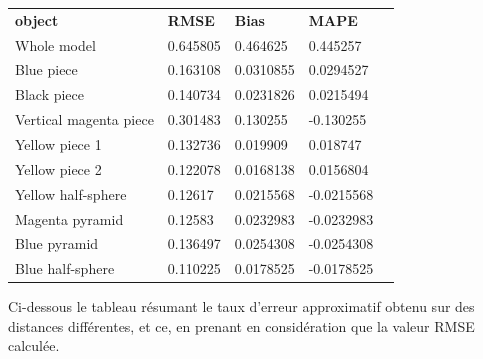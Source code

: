 \documentclass[a4paper, 12pt]{book}
\begin{document}
\begin{table}[H]
\begin{tabular}{c|llll}
\cline{1-4}
\multicolumn{1}{|l|}{\textbf{object}}   & \multicolumn{1}{l|}{\textbf{RMSE}} & \multicolumn{1}{l|}{\textbf{Bias}} & \multicolumn{1}{l|}{\textbf{MAPE}} &  \\
\cline{1-4}
\multicolumn{1}{|l|}{Whole model}  & \multicolumn{1}{l|}{0.645805}  & \multicolumn{1}{l|}{0.464625}  & \multicolumn{1}{l|}{0.445257}  &  \\ 
\cline{1-4}
\multicolumn{1}{|l|}{Blue piece}  & \multicolumn{1}{l|}{0.163108}  & \multicolumn{1}{l|}{0.0310855}  & \multicolumn{1}{l|}{0.0294527}  &  \\ 
\cline{1-4}
\multicolumn{1}{|l|}{Black piece}  & \multicolumn{1}{l|}{0.140734}  & \multicolumn{1}{l|}{0.0231826}  & \multicolumn{1}{l|}{0.0215494}  &  \\ 
\cline{1-4}
\multicolumn{1}{|l|}{Vertical magenta piece}  & \multicolumn{1}{l|}{0.301483}  & \multicolumn{1}{l|}{0.130255}  & \multicolumn{1}{l|}{-0.130255}  &  \\ 
\cline{1-4}
\multicolumn{1}{|l|}{Yellow piece 1}  & \multicolumn{1}{l|}{0.132736}  & \multicolumn{1}{l|}{0.019909}  & \multicolumn{1}{l|}{0.018747}  &  \\ 
\cline{1-4}
\multicolumn{1}{|l|}{Yellow piece 2}  & \multicolumn{1}{l|}{0.122078}  & \multicolumn{1}{l|}{0.0168138}  & \multicolumn{1}{l|}{0.0156804}  &  \\ 
\cline{1-4}
\multicolumn{1}{|l|}{Yellow half-sphere}  & \multicolumn{1}{l|}{0.12617}  & \multicolumn{1}{l|}{0.0215568}  & \multicolumn{1}{l|}{-0.0215568}  &  \\ 
\cline{1-4}
\multicolumn{1}{|l|}{Magenta pyramid}  & \multicolumn{1}{l|}{0.12583}  & \multicolumn{1}{l|}{0.0232983}  & \multicolumn{1}{l|}{-0.0232983}  &  \\ 
\cline{1-4}
\multicolumn{1}{|l|}{Blue pyramid}  & \multicolumn{1}{l|}{0.136497}  & \multicolumn{1}{l|}{0.0254308}  & \multicolumn{1}{l|}{-0.0254308}  &  \\ 
\cline{1-4}
\multicolumn{1}{|l|}{Blue  half-sphere}  & \multicolumn{1}{l|}{0.110225}  & \multicolumn{1}{l|}{0.0178525}  & \multicolumn{1}{l|}{-0.0178525}  &  \\ 
\cline{1-4}
\end{tabular}
\end{table}

\vspace{2cm}

Ci-dessous le tableau résumant le taux d'erreur approximatif obtenu sur des distances différentes, et ce, en  prenant en considération que la valeur RMSE  calculée. \\
\end{document}
